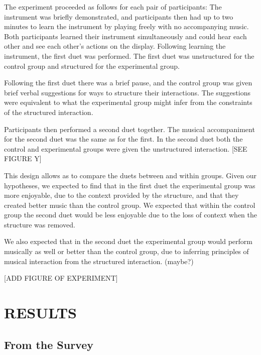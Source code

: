 \documentclass{article}
\begin{document}
The experiment proceeded as follows for each pair of participants: The instrument was briefly demonstrated, and participants then had up to two minutes to learn the instrument by playing freely with no accompanying music.  Both participants learned their instrument simultaneously and could hear each other and see each other’s actions on the display.  Following learning the instrument, the first duet was performed.  The first duet was unstructured for the control group and structured for the experimental group.
 
Following the first duet there was a brief pause, and the control group was given brief verbal suggestions for ways to structure their interactions.  The suggestions were equivalent to what the experimental group might infer from the constraints of the structured interaction.

Participants then performed a second duet together.  The musical accompaniment for the second duet was the same as for the first.  In the second duet both the control and experimental groups were given the unstructured interaction.  [SEE FIGURE Y]

This design allows as to compare the duets between and within groups.  Given our hypotheses, we expected to find that in the first duet the experimental group was more enjoyable, due to the context provided by the structure, and that they created better music than the control group. We expected that within the control group the second duet would be less enjoyable due to the loss of context when the structure was removed.  

We also expected that in the second duet the experimental group would perform musically as well or better than the control group, due to inferring principles of musical interaction from the structured interaction.  (maybe?)

[ADD FIGURE OF EXPERIMENT]


\section{RESULTS}

\subsection{From the Survey}
\end{document}
